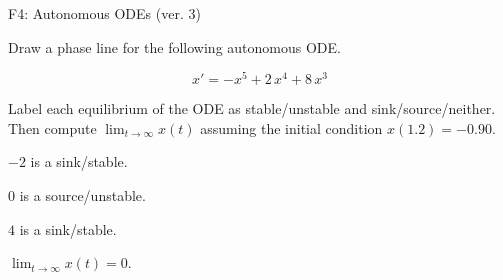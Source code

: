\begin{exercise}
  \begin{exerciseTitle}F4: Autonomous ODEs (ver. 3)\end{exerciseTitle}
  \begin{exerciseStatement}
    

      Draw a phase line for the following 
      autonomous ODE.
    

    
\[x'= -x^{5} + 2 \, x^{4} + 8 \, x^{3}\]

    

      Label each equilibrium of the ODE
      as stable/unstable and sink/source/neither.
      Then compute \(\lim_{t\to\infty}x(t)\)
      assuming the initial condition
      \(x( 1.2 )= -0.90\).
    

  \end{exerciseStatement}
  \begin{exerciseAnswer}
    

      \(-2\) is a sink/stable.
      
        \(0\) is a source/unstable.
      
      \(4\) is a sink/stable.
    

    

      \(\lim_{t\to\infty}x(t)=0\).
    

  \end{exerciseAnswer}
\end{exercise}
